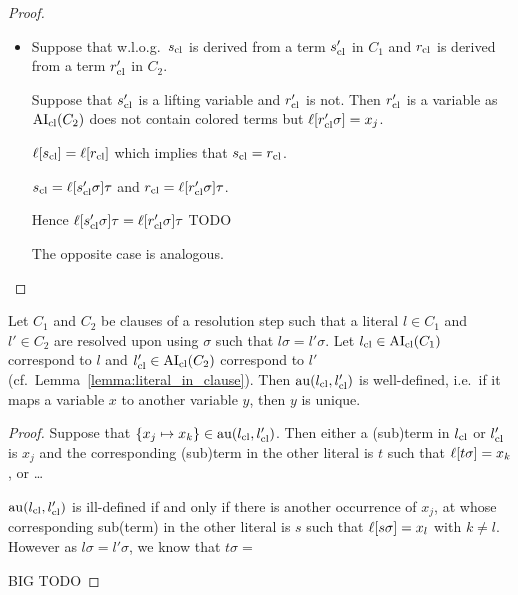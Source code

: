 \documentclass[,%
	paper=a4,%
	DIV14, 
	liststotoc,
	bibtotoc,
	draft=false,%
	numbers=noendperiod
]{scrartcl}
\begin{document}
\begin{proof}
\begin{itemize}
		\item Suppose that w.l.o.g.\ $s_\mathrm{cl}$ is derived from a term $s_\mathrm{cl}'$ in $C_1$ and $r_\mathrm{cl}$ is derived from a term $r_\mathrm{cl}'$ in $C_2$.

			Suppose that $s_\mathrm{cl}'$ is a lifting variable and $r_\mathrm{cl}'$ is not. 
			Then $r_\mathrm{cl}'$ is a variable as $\operatorname{AI}_\mathrm{cl}(C_2)$ does not contain colored terms but $\ell[r_\mathrm{cl}'\sigma] = x_j$.


			$\ell[s_\mathrm{cl}] = \ell[r_\mathrm{cl}]$ which implies that $s_\mathrm{cl} = r_\mathrm{cl}$.
			
			$s_\mathrm{cl} = \ell[s_\mathrm{cl}'\sigma]\tau$ and
			$r_\mathrm{cl} = \ell[r_\mathrm{cl}'\sigma]\tau$.

			Hence $\ell[s_\mathrm{cl}'\sigma]\tau = \ell[r_\mathrm{cl}'\sigma]\tau$
			TODO
			
			The opposite case is analogous.

	\end{itemize}

\end{proof}

\begin{conj}
	Let $C_1$ and $C_2$ be clauses of a resolution step such that a literal $l\in C_1$ and $l' \in C_2$ are resolved upon using $\sigma$ such that $l\sigma = l'\sigma$.
	Let $l_\mathrm{cl} \in \operatorname{AI}_\mathrm{cl}(C_1)$ correspond to $l$ and $l_\mathrm{cl}' \in \operatorname{AI}_\mathrm{cl}(C_2)$ correspond to $l'$ (cf.\ Lemma~\ref{lemma:literal_in_clause}).
	Then
	$\operatorname{au}(l_\mathrm{cl}, l_\mathrm{cl}')$ is well-defined, i.e.~if it maps a variable $x$ to another variable $y$, then $y$ is unique.
\end{conj}
\begin{proof}
	Suppose that $\{x_j \mapsto x_k\} \in \operatorname{au}(l_\mathrm{cl}, l_\mathrm{cl}')$.
	Then either a (sub)term in $l_\mathrm{cl}$ or $l_\mathrm{cl}'$ is $x_j$ and the corresponding (sub)term in the other literal is $t$ such that $\ell[t\sigma] = x_k$, or \dots

	$\operatorname{au}(l_\mathrm{cl}, l_\mathrm{cl}')$ is ill-defined if and only if there is another occurrence of $x_j$, at whose corresponding sub(term) in the other literal is $s$ such that $\ell[s\sigma] = x_l$ with $k\neq l$.
	However as $l\sigma = l'\sigma$, we know that $t\sigma = $

	BIG TODO

\end{proof}
\end{document}
